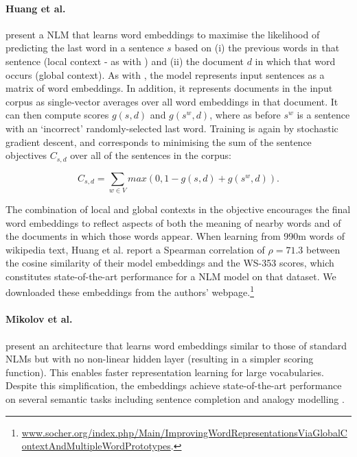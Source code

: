 \paragraph{\bf Huang et al.}

\cite{huang2012improving} present a NLM that learns word embeddings to maximise the likelihood of predicting the last word in a sentence \(s\) based on (i) the previous words in that sentence (local context - as with \cite{collobert2008unified}) and (ii) the document \( d\) in which that word occurs (global context). As with \cite{collobert2008unified}, the model represents input sentences as a matrix of word embeddings. In addition, it represents documents in the input corpus as single-vector averages over all word embeddings in that document. It can then compute scores \(g(s,d )\) and \(g(s^w, d) \), where as before \(s^w\) is a sentence with an `incorrect' randomly-selected last word. Training is again by stochastic gradient descent, and corresponds to minimising the sum of the sentence objectives \(C_{s,d} \) over all of the sentences in the corpus:

\[ C_{s,d}  = \sum_{w \in V} max(0,1-g(s,d) + g(s^w,d)). \]

The combination of local and global contexts in the objective encourages the final word embeddings to reflect aspects of both the meaning of nearby words and of the documents in which those words appear. When learning from 990m words of wikipedia text, Huang et al. report a Spearman correlation of \(\rho = 71.3\) between the cosine similarity of their model embeddings and the WS-353 scores, which constitutes state-of-the-art performance for a NLM model on that dataset. We downloaded these embeddings from the authors' webpage.\footnote{\url{www.socher.org/index.php/Main/ImprovingWordRepresentationsViaGlobalContextAndMultipleWordPrototypes}.}

\paragraph{\bf Mikolov et al.}

\cite{mikolov2013efficient} present an architecture that learns word embeddings similar to those of standard NLMs but with no non-linear hidden layer (resulting in a simpler scoring function). This enables faster representation learning for large vocabularies. Despite this simplification, the embeddings achieve state-of-the-art performance on several semantic tasks including sentence completion and analogy modelling \cite{mikolov2013efficient,mikolov2013distributed}.   

